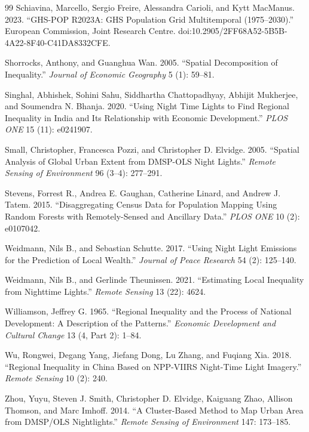 \documentclass[11pt,a4paper]{article}
\begin{document}
\begin{thebibliography}{99}
Schiavina, Marcello, Sergio Freire, Alessandra Carioli, and Kytt MacManus. 2023. ``GHS-POP R2023A: GHS Population Grid Multitemporal (1975--2030).'' European Commission, Joint Research Centre. doi:10.2905/2FF68A52-5B5B-4A22-8F40-C41DA8332CFE.

Shorrocks, Anthony, and Guanghua Wan. 2005. ``Spatial Decomposition of Inequality.'' \textit{Journal of Economic Geography} 5 (1): 59--81.

Singhal, Abhishek, Sohini Sahu, Siddhartha Chattopadhyay, Abhijit Mukherjee, and Soumendra N. Bhanja. 2020. ``Using Night Time Lights to Find Regional Inequality in India and Its Relationship with Economic Development.'' \textit{PLOS ONE} 15 (11): e0241907.

Small, Christopher, Francesca Pozzi, and Christopher D. Elvidge. 2005. ``Spatial Analysis of Global Urban Extent from DMSP-OLS Night Lights.'' \textit{Remote Sensing of Environment} 96 (3--4): 277--291.

Stevens, Forrest R., Andrea E. Gaughan, Catherine Linard, and Andrew J. Tatem. 2015. ``Disaggregating Census Data for Population Mapping Using Random Forests with Remotely-Sensed and Ancillary Data.'' \textit{PLOS ONE} 10 (2): e0107042.

Weidmann, Nils B., and Sebastian Schutte. 2017. ``Using Night Light Emissions for the Prediction of Local Wealth.'' \textit{Journal of Peace Research} 54 (2): 125--140.

Weidmann, Nils B., and Gerlinde Theunissen. 2021. ``Estimating Local Inequality from Nighttime Lights.'' \textit{Remote Sensing} 13 (22): 4624.

Williamson, Jeffrey G. 1965. ``Regional Inequality and the Process of National Development: A Description of the Patterns.'' \textit{Economic Development and Cultural Change} 13 (4, Part 2): 1--84.

Wu, Rongwei, Degang Yang, Jiefang Dong, Lu Zhang, and Fuqiang Xia. 2018. ``Regional Inequality in China Based on NPP-VIIRS Night-Time Light Imagery.'' \textit{Remote Sensing} 10 (2): 240.

Zhou, Yuyu, Steven J. Smith, Christopher D. Elvidge, Kaiguang Zhao, Allison Thomson, and Marc Imhoff. 2014. ``A Cluster-Based Method to Map Urban Area from DMSP/OLS Nightlights.'' \textit{Remote Sensing of Environment} 147: 173--185.

\end{thebibliography}
\end{document}
